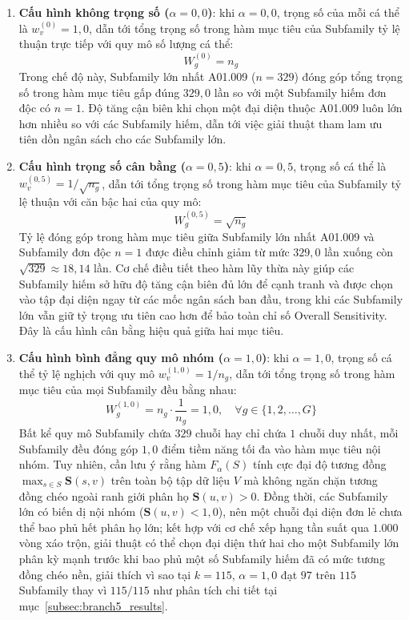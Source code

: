 \begin{enumerate}
    \item \textbf{Cấu hình không trọng số ($\alpha = 0{,}0$)}: khi $\alpha = 0{,}0$, trọng số của mỗi cá thể là $w_v^{(0)} = 1{,}0$, dẫn tới tổng trọng số trong hàm mục tiêu của Subfamily tỷ lệ thuận trực tiếp với quy mô số lượng cá thể:
    \begin{equation}
    W_g^{(0)} = n_g
    \end{equation}
    Trong chế độ này, Subfamily lớn nhất A01.009 ($n = 329$) đóng góp tổng trọng số trong hàm mục tiêu gấp đúng $329{,}0$ lần so với một Subfamily hiếm đơn độc có $n = 1$. Độ tăng cận biên khi chọn một đại diện thuộc A01.009 luôn lớn hơn nhiều so với các Subfamily hiếm, dẫn tới việc giải thuật tham lam ưu tiên dồn ngân sách cho các Subfamily lớn.
    
    \item \textbf{Cấu hình trọng số cân bằng ($\alpha = 0{,}5$)}: khi $\alpha = 0{,}5$, trọng số cá thể là $w_v^{(0{,}5)} = 1/\sqrt{n_g}$, dẫn tới tổng trọng số trong hàm mục tiêu của Subfamily tỷ lệ thuận với căn bậc hai của quy mô:
    \begin{equation}
    W_g^{(0{,}5)} = \sqrt{n_g}
    \end{equation}
    Tỷ lệ đóng góp trong hàm mục tiêu giữa Subfamily lớn nhất A01.009 và Subfamily đơn độc $n = 1$ được điều chỉnh giảm từ mức $329{,}0$ lần xuống còn $\sqrt{329} \approx 18{,}14$ lần. Cơ chế điều tiết theo hàm lũy thừa này giúp các Subfamily hiếm sở hữu độ tăng cận biên đủ lớn để cạnh tranh và được chọn vào tập đại diện ngay từ các mốc ngân sách ban đầu, trong khi các Subfamily lớn vẫn giữ tỷ trọng ưu tiên cao hơn để bảo toàn chỉ số Overall Sensitivity. Đây là cấu hình cân bằng hiệu quả giữa hai mục tiêu.
    
    \item \textbf{Cấu hình bình đẳng quy mô nhóm ($\alpha = 1{,}0$)}: khi $\alpha = 1{,}0$, trọng số cá thể tỷ lệ nghịch với quy mô $w_v^{(1{,}0)} = 1/n_g$, dẫn tới tổng trọng số trong hàm mục tiêu của mọi Subfamily đều bằng nhau:
    \begin{equation}
    W_g^{(1{,}0)} = n_g \cdot \frac{1}{n_g} = 1{,}0, \quad \forall g \in \{1, 2, \dots, G\}
    \end{equation}
    Bất kể quy mô Subfamily chứa $329$ chuỗi hay chỉ chứa $1$ chuỗi duy nhất, mỗi Subfamily đều đóng góp $1{,}0$ điểm tiềm năng tối đa vào hàm mục tiêu nội nhóm. Tuy nhiên, cần lưu ý rằng hàm $F_\alpha(S)$ tính cực đại độ tương đồng $\max_{s \in S} \mathbf{S}(s, v)$ trên toàn bộ tập dữ liệu $V$ mà không ngăn chặn tương đồng chéo ngoài ranh giới phân họ $\mathbf{S}(u, v) > 0$. Đồng thời, các Subfamily lớn có biến dị nội nhóm ($\mathbf{S}(u, v) < 1{,}0$), nên một chuỗi đại diện đơn lẻ chưa thể bao phủ hết phân họ lớn; kết hợp với cơ chế xếp hạng tần suất qua $1.000$ vòng xáo trộn, giải thuật có thể chọn đại diện thứ hai cho một Subfamily lớn phân kỳ mạnh trước khi bao phủ một số Subfamily hiếm đã có mức tương đồng chéo nền, giải thích vì sao tại $k = 115$, $\alpha = 1{,}0$ đạt $97$ trên $115$ Subfamily thay vì $115/115$ như phân tích chi tiết tại mục~\ref{subsec:branch5_results}.
\end{enumerate}

